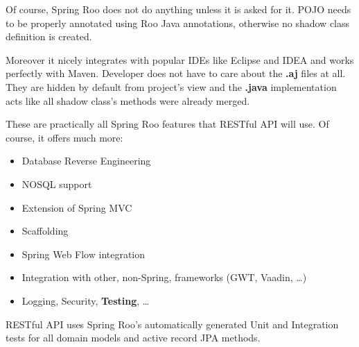 	Of course, Spring Roo does not do anything unless it is asked for it. POJO needs to be properly annotated using Roo
	Java annotations, otherwise no shadow class definition is created.
	
	Moreover it nicely integrates with popular IDEs like Eclipse and IDEA and works perfectly with Maven. Developer does
	not have to care about the \textbf{.aj} files at all. They are hidden by default from project's view and the
	\textbf{.java} implementation acts like all shadow class's methods were already merged.
	
	These are practically all Spring Roo features that RESTful API will use. Of course, it offers much more:
	
	\begin{itemize}
	  \item Database Reverse Engineering
	  \item NOSQL support
	  \item Extension of Spring MVC
	  \item Scaffolding
	  \item Spring Web Flow integration
	  \item Integration with other, non-Spring, frameworks (GWT, Vaadin, \ldots)
	  \item Logging, Security, \textbf{Testing}, \ldots
	\end{itemize}

	RESTful API uses Spring Roo's automatically generated Unit and Integration tests for all domain models and active
	record JPA methods.
